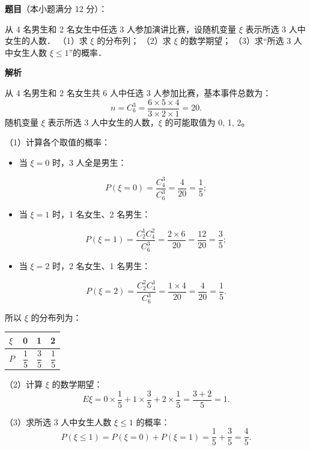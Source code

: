 \begin{answer}

\textbf{题目}（本小题满分 12 分）：

从 4 名男生和 2 名女生中任选 3 人参加演讲比赛，设随机变量 $\xi$ 表示所选 3 人中女生的人数．
（1）求 $\xi$ 的分布列；
（2）求 $\xi$ 的数学期望；
（3）求“所选 3 人中女生人数 $\xi \le 1$”的概率．

\textbf{解析}

从 4 名男生和 2 名女生共 6 人中任选 3 人参加比赛，基本事件总数为：
\nopagebreak[4]
\[
n = C_6^3 = \dfrac{6 \times 5 \times 4}{3 \times 2 \times 1} = 20.
\]
随机变量 $\xi$ 表示所选 3 人中女生的人数，$\xi$ 的可能取值为 0, 1, 2。

（1）计算各个取值的概率：
\begin{itemize}
\item 当 $\xi = 0$ 时，3 人全是男生：
\end{itemize}
\nopagebreak[4]
\[
P(\xi = 0) = \dfrac{C_4^3}{C_6^3} = \dfrac{4}{20} = \dfrac{1}{5};
\]
\begin{itemize}
\item 当 $\xi = 1$ 时，1 名女生、2 名男生：
\end{itemize}
\nopagebreak[4]
\[
P(\xi = 1) = \dfrac{C_2^1 C_4^2}{C_6^3} = \dfrac{2 \times 6}{20} = \dfrac{12}{20} = \dfrac{3}{5};
\]
\begin{itemize}
\item 当 $\xi = 2$ 时，2 名女生、1 名男生：
\end{itemize}
\nopagebreak[4]
\[
P(\xi = 2) = \dfrac{C_2^2 C_4^1}{C_6^3} = \dfrac{1 \times 4}{20} = \dfrac{4}{20} = \dfrac{1}{5}.
\]

所以 $\xi$ 的分布列为：

\begin{center}
\begin{tabular}{llll}
\toprule
$\xi$ & 0 & 1 & 2 \\
\midrule
$P$ & $\dfrac{1}{5}$ & $\dfrac{3}{5}$ & $\dfrac{1}{5}$ \\
\bottomrule
\end{tabular}
\end{center}

（2）计算 $\xi$ 的数学期望：
\nopagebreak[4]
\[
E\xi = 0 \times \dfrac{1}{5} + 1 \times \dfrac{3}{5} + 2 \times \dfrac{1}{5} = \dfrac{3 + 2}{5} = 1.
\]

（3）求所选 3 人中女生人数 $\xi \le 1$ 的概率：
\nopagebreak[4]
\[
P(\xi \le 1) = P(\xi = 0) + P(\xi = 1) = \dfrac{1}{5} + \dfrac{3}{5} = \dfrac{4}{5}.
\]


\end{answer}
